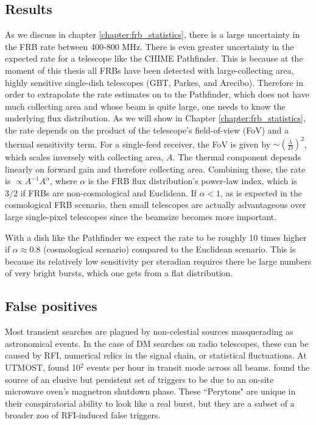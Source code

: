 \subsection{Results}
As we discuss in chapter \ref{chapter:frb_statistics}, there is 
a large uncertainty in the FRB rate between 400-800 MHz. There 
is even greater uncertainty in the expected rate for a 
telescope like the CHIME Pathfinder. This is because at the moment of 
this thesis all FRBs
have been detected with large-collecting area, highly sensitive single-dish 
telescopes (GBT, Parkes, and Arecibo). Therefore in order to 
extrapolate the rate estimates on to the Pathfinder, which 
does not have much collecting area and whose beam is quite large, one 
needs to know the underlying flux distribution. As we will show 
in Chapter \ref{chapter:frb_statistics}, the rate depends on the product 
of the telescope's field-of-view (FoV) and a thermal sensitivity term. 
For a single-feed receiver, the FoV is given by 
$\sim \left(\frac{\lambda}{D}\right)^2$, which scales inversely with 
collecting area, $A$. The thermal component depends linearly
on forward gain and therefore collecting area. Combining these, 
the rate is $\propto A^{-1} A^\alpha$, where $\alpha$ 
is the FRB flux distribution's power-law index, which is 
$3/2$ if FRBs are non-cosmological and Euclidean. If $\alpha < 1$, 
as is expected in the cosmological FRB scenario, then 
small telescopes are actually advantageous over large single-pixel telescopes 
since the beamsize becomes more important. 

With a dish like the Pathfinder
we expect the rate to be 
roughly 10 times higher if $\alpha\approx 0.8$ (cosmological scenario) 
compared to the Euclidean scenario. This is because its relatively 
low sensitivity per steradian requires there be large numbers 
of very bright bursts, which one gets from a flat distribution.

\subsection{False positives}

Most transient searches are plagued by non-celestial sources masquerading 
as astronomical events. 
In the case of DM searches on 
radio telescopes, these can be caused by RFI, numerical relics 
in the signal chain, or statistical fluctuations. 
At UTMOST, \citet{2016MNRAS.458..718C} found 
10$^2$ events per hour in transit mode across all beams. \citet{2015MNRAS.451.3933P}
found the source of an elusive but persistent set of triggers 
to be due to an on-site microwave oven's magnetron shutdown phase. These 
``Perytons" are unique in their conspiratorial ability to 
look like a real burst, but they are a subset of a broader zoo 
of RFI-induced false triggers. 

